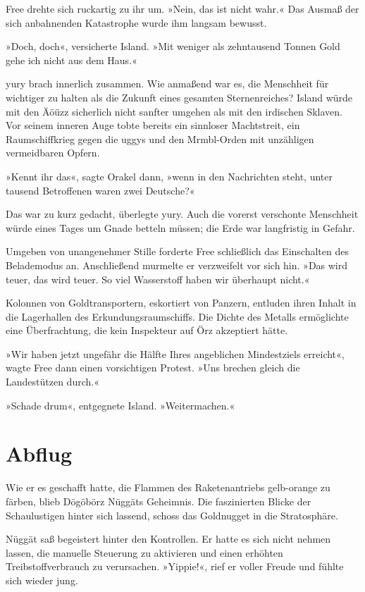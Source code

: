Free drehte sich ruckartig zu ihr um. »Nein, das ist nicht wahr.« Das Ausmaß der sich anbahnenden Katastrophe wurde ihm langsam bewusst.

»Doch, doch«, versicherte Island. »Mit weniger als zehntausend Tonnen Gold gehe ich nicht aus dem Haus.«

yury brach innerlich zusammen. Wie anmaßend war es, die Menschheit für wichtiger zu halten als die Zukunft eines gesamten Sternenreiches? Island würde mit den Äöüzz sicherlich nicht sanfter umgehen als mit den irdischen Sklaven. Vor seinem inneren Auge tobte bereits ein sinnloser Machtstreit, ein Raumschiffkrieg gegen die uggys und den Mrmbl-Orden mit unzähligen vermeidbaren Opfern.

»Kennt ihr das«, sagte Orakel dann, »wenn in den Nachrichten steht, unter tausend Betroffenen waren zwei Deutsche?«

Das war zu kurz gedacht, überlegte yury. Auch die vorerst verschonte Menschheit würde eines Tages um Gnade betteln müssen; die Erde war langfristig in Gefahr.

Umgeben von unangenehmer Stille forderte Free schließlich das Einschalten des Belademodus an. Anschließend murmelte er verzweifelt vor sich hin. »Das wird teuer, das wird teuer. So viel Wasserstoff haben wir überhaupt nicht.«

Kolonnen von Goldtransportern, eskortiert von Panzern, entluden ihren Inhalt in die Lagerhallen des Erkundungsraumschiffs. Die Dichte des Metalls ermöglichte eine Überfrachtung, die kein Inspekteur auf Örz akzeptiert hätte.

»Wir haben jetzt ungefähr die Hälfte Ihres angeblichen Mindestziels erreicht«, wagte Free dann einen vorsichtigen Protest. »Uns brechen gleich die Landestützen durch.«

»Schade drum«, entgegnete Island. »Weitermachen.«


\chapter{Abflug}

Wie er es geschafft hatte, die Flammen des Raketenantriebs gelb-orange zu färben, blieb Dögöbörz Nüggäts Geheimnis. Die faszinierten Blicke der Schaulustigen hinter sich lassend, schoss das Goldnugget in die Stratosphäre.

Nüggät saß begeistert hinter den Kontrollen. Er hatte es sich nicht nehmen lassen, die manuelle Steuerung zu aktivieren und einen erhöhten Treibstoffverbrauch zu verursachen. »Yippie!«, rief er voller Freude und fühlte sich wieder jung.

